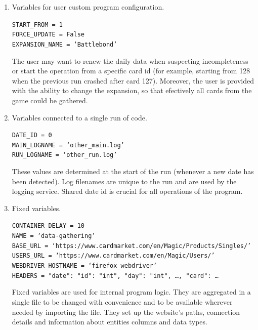 \begin{enumerate}
      \item Variables for user custom program configuration. \par
            \texttt{START\_FROM = 1\\ FORCE\_UPDATE = False\\ EXPANSION\_NAME = `Battlebond'} \par
            The user may want to renew the daily data when suspecting incompleteness or start the operation from a specific card id (for example, starting from 128 when the previous run crashed after card 127). Moreover, the user is provided with the ability to change the expansion, so that efectively all cards from the game could be gathered.
      \item Variables connected to a single run of code. \par
            \texttt{DATE\_ID = 0\\ MAIN\_LOGNAME = `other\_main.log'\\ RUN\_LOGNAME = `other\_run.log'} \par
            These values are determined at the start of the run (whenever a new date has been detected). Log filenames are unique to the run and are used by the logging service. Shared date id is crucial for all operations of the program.
      \item Fixed variables. \par
            \texttt{CONTAINER\_DELAY = 10\\ NAME = `data-gathering'\\ BASE\_URL = `https://www.cardmarket.com/en/Magic/Products/Singles/'\\ USERS\_URL = `https://www.cardmarket.com/en/Magic/Users/'\\ WEBDRIVER\_HOSTNAME = `firefox\_webdriver'\\ HEADERS = \textbraceleft"date": \textbraceleft"id": "int", "day": "int", \dots\textbraceright, "card": \dots\textbraceright} \par
            Fixed variables are used for internal program logic. They are aggregated in a single file to be changed with convenience and to be available wherever needed by importing the file. They set up the website's paths, connection details and information about entities columns and data types.
\end{enumerate}

